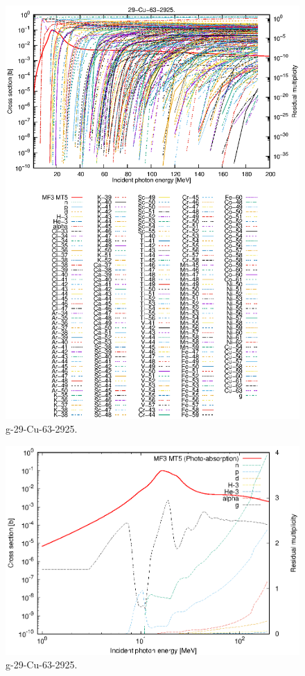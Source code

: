 \begin{figure}
 \includegraphics[width=\linewidth]{eps/g_29-Cu-63_2925.eps}
  \caption{g-29-Cu-63-2925.}
\end{figure}
\newpage \clearpage

\begin{figure}
 \includegraphics[width=\linewidth]{eps-log/g_29-Cu-63_2925.eps}
 \caption{g-29-Cu-63-2925.}
\end{figure}
\newpage \clearpage

